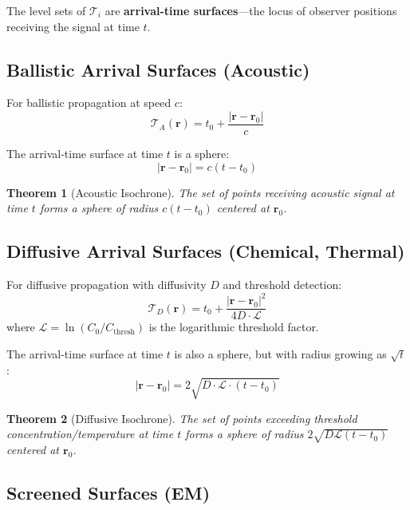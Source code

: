 \documentclass[11pt,a4paper]{article}
\newtheorem{theorem}{Theorem}[section]
\theoremstyle{remark}
\newcommand{\rxnpos}{\mathbf{r}_0}
\newcommand{\rxntime}{t_0}
\newcommand{\obspos}{\mathbf{r}}
\begin{document}
The level sets of $\mathcal{T}_i$ are \textbf{arrival-time surfaces}---the locus of observer positions receiving the signal at time $t$.

\subsection{Ballistic Arrival Surfaces (Acoustic)}

For ballistic propagation at speed $c$:
\begin{equation}
    \mathcal{T}_A(\obspos) = \rxntime + \frac{|\obspos - \rxnpos|}{c}
\end{equation}

The arrival-time surface at time $t$ is a sphere:
\begin{equation}
    |\obspos - \rxnpos| = c(t - \rxntime)
\end{equation}

\begin{theorem}[Acoustic Isochrone]
\label{thm:acoustic_iso}
The set of points receiving acoustic signal at time $t$ forms a sphere of radius $c(t-\rxntime)$ centered at $\rxnpos$.
\end{theorem}

\subsection{Diffusive Arrival Surfaces (Chemical, Thermal)}

For diffusive propagation with diffusivity $D$ and threshold detection:
\begin{equation}
    \mathcal{T}_D(\obspos) = \rxntime + \frac{|\obspos - \rxnpos|^2}{4D \cdot \mathcal{L}}
\end{equation}
where $\mathcal{L} = \ln(C_0/C_{\text{thresh}})$ is the logarithmic threshold factor.

The arrival-time surface at time $t$ is also a sphere, but with radius growing as $\sqrt{t}$:
\begin{equation}
    |\obspos - \rxnpos| = 2\sqrt{D \cdot \mathcal{L} \cdot (t - \rxntime)}
\end{equation}

\begin{theorem}[Diffusive Isochrone]
\label{thm:diffusive_iso}
The set of points exceeding threshold concentration/temperature at time $t$ forms a sphere of radius $2\sqrt{D\mathcal{L}(t-\rxntime)}$ centered at $\rxnpos$.
\end{theorem}

\subsection{Screened Surfaces (EM)}
\end{document}
